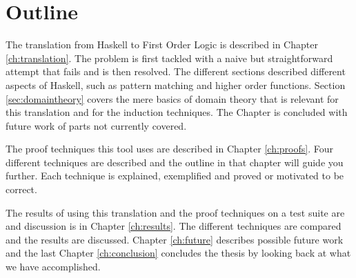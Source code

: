
\section{Outline}

The translation from Haskell to First Order Logic is described in
Chapter \ref{ch:translation}. The problem is first tackled with a
naive but straightforward attempt that fails and is then resolved. The
different sections described different aspects of Haskell, such as
pattern matching and higher order functions.  Section
\ref{sec:domaintheory} covers the mere basics of domain theory that is
relevant for this translation and for the induction techniques.  The
Chapter is concluded with future work of parts not currently covered.

The proof techniques this tool uses are described in Chapter
\ref{ch:proofs}. Four different techniques are described and the
outline in that chapter will guide you further. Each technique is
explained, exemplified and proved or motivated to be correct.

The results of using this translation and the proof techniques on a
test suite are and discussion is in Chapter \ref{ch:results}. The
different techniques are compared and the results are discussed.
Chapter \ref{ch:future} describes possible future work and the last
Chapter \ref{ch:conclusion} concludes the thesis by looking back at
what we have accomplished.
